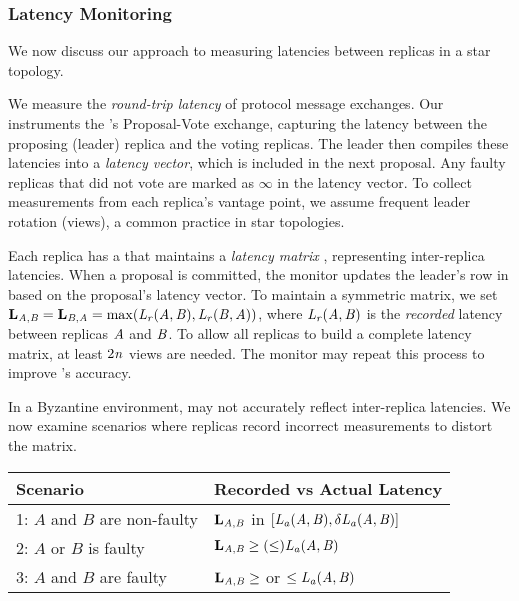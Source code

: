 \subsubsection{Latency Monitoring}
\label{sec:latency}

We now discuss our approach to measuring latencies between replicas in a star topology.

We measure the \textit{round-trip latency} of protocol message exchanges.
Our \latsensor instruments the \consmod's Proposal-Vote exchange, capturing the latency between the proposing (leader) replica and the voting replicas.
The leader then compiles these latencies into a \textit{latency vector}, which is included in the next proposal.
Any faulty replicas that did not vote are marked as $\infty$ in the latency vector.
To collect measurements from each replica's vantage point, we assume frequent leader rotation (views), a common practice in star topologies.

Each replica has a \latmonitor that maintains a \textit{latency matrix} \lm, representing inter-replica latencies.
When a proposal is committed, the monitor updates the leader's row in \lm based on the proposal's latency vector.
To maintain a symmetric matrix, we set $\lme{\na}{\nb}=\lme{\nb}{\na}=\max(\lat[r]{\na}{\nb}, \lat[r]{\nb}{\na})$, where $\lat[r]{\na}{\nb}$ is the \textit{recorded} latency between replicas $\na$ and $\nb$.
To allow all replicas to build a complete latency matrix, at least $2\n$ views are needed.
The monitor may repeat this process to improve \lm's accuracy.

In a Byzantine environment, \lm may not accurately reflect inter-replica latencies.
We now examine scenarios where replicas record incorrect measurements to distort the matrix.

\begin{table}[ht]
  \footnotesize
  \centering
  \begin{tabular}{@{}ll@{}}
    \toprule
    \textbf{Scenario}              & \textbf{Recorded vs Actual Latency} \\ \midrule
    1: $A$ and $B$ are non-faulty  & $\lme{\na}{\nb}$ in $[\lat[a]{\na}{\nb}, \delta\lat[a]{\na}{\nb}]$ \\
    2: $A$ or $B$ is faulty        & $\lme{\na}{\nb} \geq (\leq) \lat[a]{\na}{\nb}$ \\
    3: $A$ and $B$ are faulty      & $\lme{\na}{\nb} \geq$ or $\leq \lat[a]{\na}{\nb}$ \\
    \bottomrule
  \end{tabular}
\end{table}

